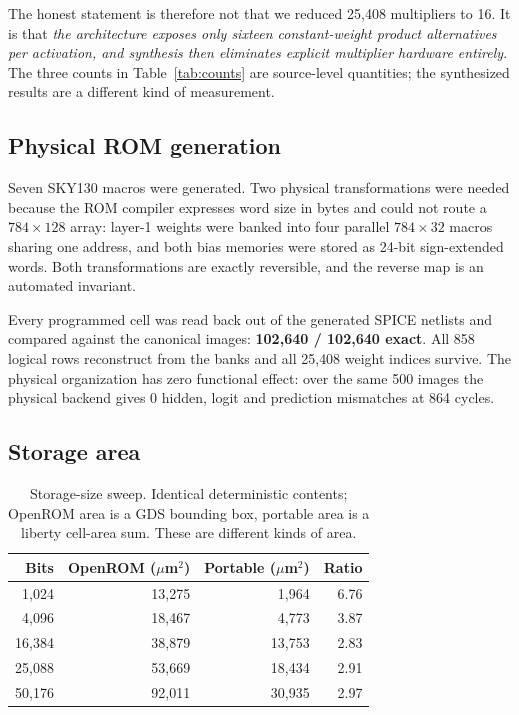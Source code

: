 \documentclass[conference]{IEEEtran}
\begin{document}
The honest statement is therefore not that we reduced 25{,}408 multipliers to
16. It is that \emph{the architecture exposes only sixteen constant-weight
product alternatives per activation, and synthesis then eliminates explicit
multiplier hardware entirely}. The three counts in Table~\ref{tab:counts} are
source-level quantities; the synthesized results are a different kind of
measurement.

\subsection{Physical ROM generation}

Seven SKY130 macros were generated. Two physical transformations were needed
because the ROM compiler expresses word size in bytes and could not route a
$784{\times}128$ array: layer-1 weights were banked into four parallel
$784{\times}32$ macros sharing one address, and both bias memories were stored
as 24-bit sign-extended words. Both transformations are exactly reversible, and
the reverse map is an automated invariant.

Every programmed cell was read back out of the generated SPICE netlists and
compared against the canonical images: \textbf{102{,}640 / 102{,}640 exact}.
All 858 logical rows reconstruct from the banks and all 25{,}408 weight indices
survive. The physical organization has zero functional effect: over the same
500 images the physical backend gives 0 hidden, logit and prediction
mismatches at 864 cycles.

\subsection{Storage area}

\begin{table}[h]
\centering
\caption{Storage-size sweep. Identical deterministic contents; OpenROM area is
a GDS bounding box, portable area is a liberty cell-area sum. These are
different kinds of area.}
\label{tab:crossover}
\begin{tabular}{rrrr}
\toprule
Bits & OpenROM ($\mu$m$^2$) & Portable ($\mu$m$^2$) & Ratio \\
\midrule
1{,}024  & 13{,}275 & 1{,}964  & 6.76 \\
4{,}096  & 18{,}467 & 4{,}773  & 3.87 \\
16{,}384 & 38{,}879 & 13{,}753 & 2.83 \\
25{,}088 & 53{,}669 & 18{,}434 & 2.91 \\
50{,}176 & 92{,}011 & 30{,}935 & 2.97 \\
\bottomrule
\end{tabular}
\end{table}
\end{document}
